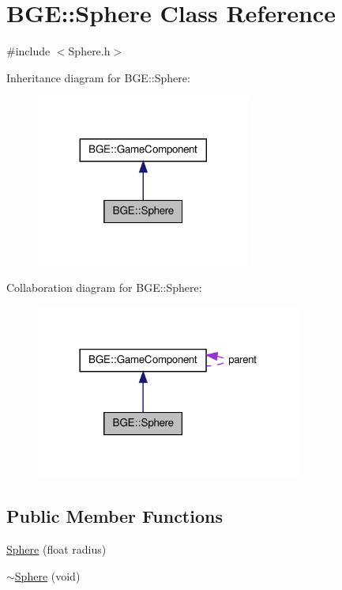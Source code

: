 \hypertarget{class_b_g_e_1_1_sphere}{\section{B\-G\-E\-:\-:Sphere Class Reference}
\label{class_b_g_e_1_1_sphere}
}


{\ttfamily \#include $<$Sphere.\-h$>$}



Inheritance diagram for B\-G\-E\-:\-:Sphere\-:
\nopagebreak
\begin{figure}[H]
\begin{center}
\leavevmode
\includegraphics[width=200pt]{class_b_g_e_1_1_sphere__inherit__graph}
\end{center}
\end{figure}


Collaboration diagram for B\-G\-E\-:\-:Sphere\-:
\nopagebreak
\begin{figure}[H]
\begin{center}
\leavevmode
\includegraphics[width=249pt]{class_b_g_e_1_1_sphere__coll__graph}
\end{center}
\end{figure}
\subsection*{Public Member Functions}
\begin{DoxyCompactItemize}
\item 
\hyperlink{class_b_g_e_1_1_sphere_a066dd77d24d95f7cb2e16880b3a5ae6e}{Sphere} (float radius)
\item 
\hyperlink{class_b_g_e_1_1_sphere_a06751e96904eb3378d3b10043530ac4a}{$\sim$\-Sphere} (void)
\end{DoxyCompactItemize}
